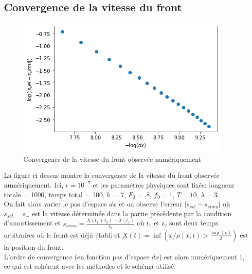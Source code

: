 \documentclass[11pt]{article}
\begin{document}
\subsection{Convergence de la vitesse du front}

\begin{figure}[h]
\centering
\includegraphics[width=.9\textwidth]{Images/ordrecv_vitessefluide.png}
\caption{Convergence de la vitesse du front observée numériquement}
\end{figure}
La figure ci dessus montre la convergence de la vitesse du front observée numériquement. Ici, $\epsilon=10^{-7}$ et les paramètres physiques sont fixés: 
longueur totale = 1000,
temps total = 100,
$b = .7$,
$F_0 = .8$,
$f_0 = 1$,
$T=10$,
$\lambda =3$.\\
On fait alors varier le pas d'espace $dx$ et on observe l'erreur $|s_{sel}-s_{simu}|$  où $s_{sel}=s_-$ est la vitesse déterminée dans la partie précédente par la condition d'amortissement et $s_{simu}=\frac{X(t_1+t_2)-X(t_1)}{t_2}$ où $t_1$ et $t_2$ sont deux temps arbitraires où le front est déjà établi et $
	 X(t)=\inf(x / \rho(x,t)> \frac{\sup(\rho)}{2}) $ est la position du front.\\
L'ordre de convergence (en fonction pas d'espace $dx$) est alors numériquement 1, ce qui est cohérent avec les méthodes et le schéma utilisé.  
\newpage
\end{document}
